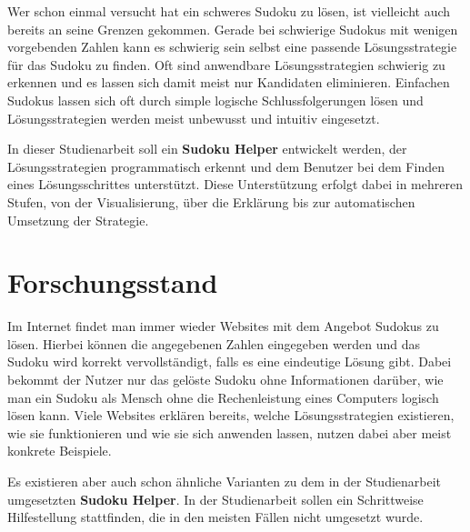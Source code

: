 Wer schon einmal versucht hat ein schweres Sudoku  zu lösen, ist vielleicht auch bereits an seine Grenzen gekommen. Gerade bei schwierige Sudokus mit wenigen vorgebenden Zahlen kann es schwierig sein selbst eine passende Lösungsstrategie für das Sudoku zu finden. Oft sind anwendbare Lösungsstrategien schwierig zu erkennen und es lassen sich damit meist nur Kandidaten eliminieren. Einfachen Sudokus lassen sich oft durch simple logische Schlussfolgerungen lösen und Lösungsstrategien werden meist unbewusst und intuitiv eingesetzt. \cite{martin}

In dieser Studienarbeit soll ein \textbf{Sudoku Helper} entwickelt werden, der Lösungsstrategien programmatisch erkennt und dem Benutzer bei dem Finden eines Lösungsschrittes unterstützt. Diese Unterstützung erfolgt dabei in mehreren Stufen, von der Visualisierung, über die Erklärung bis zur automatischen Umsetzung der Strategie.


\section{Forschungsstand}
Im Internet findet man immer wieder Websites mit dem Angebot Sudokus zu lösen. Hierbei können die angegebenen Zahlen eingegeben werden und das Sudoku wird korrekt vervollständigt, falls es eine eindeutige Lösung gibt. Dabei bekommt der Nutzer nur das gelöste Sudoku ohne Informationen darüber, wie man ein Sudoku als Mensch ohne die Rechenleistung eines Computers logisch lösen kann. Viele Websites erklären bereits, welche Lösungsstrategien existieren, wie sie funktionieren und wie sie sich anwenden lassen, nutzen dabei aber meist konkrete Beispiele.

Es existieren aber auch schon ähnliche Varianten zu dem in der Studienarbeit umgesetzten \textbf{Sudoku Helper}. In der Studienarbeit sollen ein Schrittweise Hilfestellung stattfinden, die in den meisten Fällen nicht umgesetzt wurde. 




